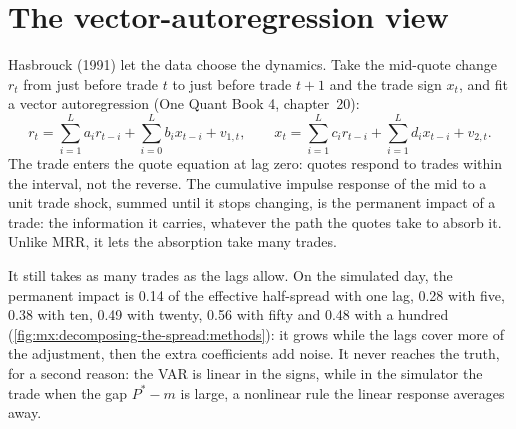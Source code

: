 \section{The vector-autoregression view}

Hasbrouck (1991) let the data choose the dynamics. Take the mid-quote change $r_t$ from just before trade $t$ to just before trade $t+1$ and the trade
sign $x_t$, and fit a vector autoregression (One Quant Book 4, chapter~20):
\[
r_t=\sum_{i=1}^{L}a_ir_{t-i}+\sum_{i=0}^{L}b_ix_{t-i}+v_{1,t},\qquad x_t=\sum_{i=1}^{L}c_ir_{t-i}+\sum_{i=1}^{L}d_ix_{t-i}+v_{2,t}.
\]
The trade enters the quote equation at lag zero: quotes respond to trades within the interval, not the reverse. The cumulative impulse response of the mid
to a unit trade shock, summed until it stops changing, is the permanent impact of a trade: the information it carries, whatever the path the quotes take
to absorb it. Unlike MRR, it lets the absorption take many trades.

It still takes as many trades as the lags allow. On the simulated day, the permanent impact is 0.14 of the effective half-spread with one lag, 0.28 with
five, 0.38 with ten, 0.49 with twenty, 0.56 with fifty and 0.48 with a hundred (\cref{fig:mx:decomposing-the-spread:methods}): it grows while the lags
cover more of the adjustment, then the extra coefficients add noise. It never reaches the truth, for a second reason: the VAR is linear in the signs,
while in the simulator the  trade when the gap $P^\ast-m$ is large, a nonlinear rule the linear response averages away.

\begin{omfigure}

\label{fig:mx:decomposing-the-spread:methods}
\end{omfigure}

